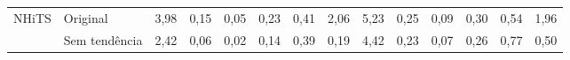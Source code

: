 \begin{tabular}{llcccccccccccc}
	\midrule
	\multirow{2}{*}{\ac{NHiTS}}
	                                    & Original                                        & 3,98                                                           & 0,15          & 0,05          & 0,23          & 0,41          & 2,06          & 5,23          & 0,25          & 0,09          & 0,30          & 0,54          & 1,96          \\
	                                    & Sem tendência                                   & 2,42                                                           & 0,06          & 0,02          & 0,14          & 0,39          & 0,19          & 4,42          & 0,23          & 0,07          & 0,26          & 0,77          & 0,50          \\
	\bottomrule
\end{tabular}